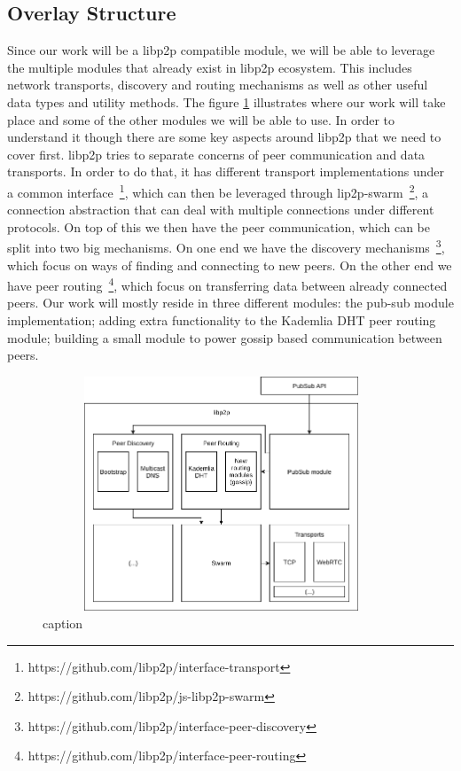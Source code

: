 \subsection{Overlay Structure}\label{overlay-structure-solution}

Since our work will be a libp2p compatible module, we will be able to
leverage the multiple modules that already exist in libp2p ecosystem.
This includes network transports, discovery and routing mechanisms as
well as other useful data types and utility methods. The figure \ref{fig:libp2p-stack}
illustrates where our work will take place and
some of the other modules we will be able to use. In order to understand
it though there are some key aspects around libp2p that we need to cover
first. libp2p tries to separate concerns of peer communication and data
transports. In order to do that, it has different transport implementations
under a common interface~\footnote{https://github.com/libp2p/interface-transport},
which can then be leveraged through lip2p-swarm~\footnote{https://github.com/libp2p/js-libp2p-swarm},
a connection abstraction that can deal with multiple
connections under different protocols. On top of this we then have the
peer communication, which can be split into two big mechanisms. On one
end we have the discovery mechanisms~\footnote{https://github.com/libp2p/interface-peer-discovery},
which focus on ways of finding and connecting to new peers.
On the other end we have peer routing~\footnote{https://github.com/libp2p/interface-peer-routing},
which focus on transferring data between already connected
peers. Our work will mostly reside in three different modules: the
pub-sub module implementation; adding extra functionality to the
Kademlia DHT peer routing module; building a small module to power
gossip based communication between peers.

\begin{figure}[hb!]
  \centering
  \includegraphics[max height=7cm,max width=0.95\textwidth]{img/libp2p-stack.png}
  \caption{caption}
  \label{fig:libp2p-stack}
\end{figure}

